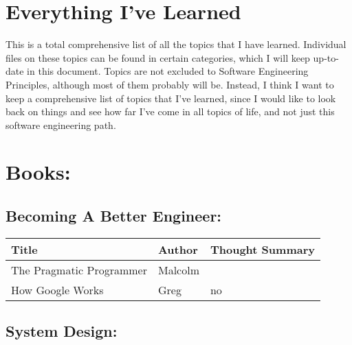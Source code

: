 \documentclass{article}
\begin{document}
\section*{Everything I've Learned}
This is a total comprehensive list of all the topics that I have learned. Individual files on these topics can be found in certain categories, which I will keep up-to-date in this document. Topics are not excluded to Software Engineering Principles, although most of them probably will be. Instead, I think I want to keep a comprehensive list of topics that I've learned, since I would like to look back on things and see how far I've come in all topics of life, and not just this software engineering path.

\section*{Books:}

\subsection*{Becoming A Better Engineer:}

\begin{tabularx}{0.8\textwidth} { 
  | >{\centering\arraybackslash}X 
  | >{\centering\arraybackslash}X 
  | >{\centering\arraybackslash}X | }
    \hline
    Title & Author & Thought Summary\\
    \hline
     The Pragmatic Programmer & Malcolm &  \\
     \hline
     How Google Works & Greg & no\\
     \hline

\end{tabularx}

\subsection*{System Design:}
\end{document}
